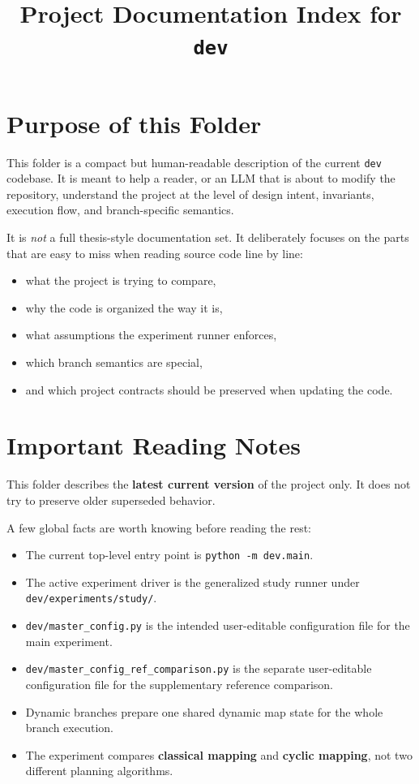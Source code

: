 \documentclass[11pt]{article}
\title{Project Documentation Index for \texttt{dev}}
\author{}
\date{}
\begin{document}
\maketitle

\section{Purpose of this Folder}

This folder is a compact but human-readable description of the current \texttt{dev} codebase. It is meant to help a reader, or an LLM that is about to modify the repository, understand the project at the level of design intent, invariants, execution flow, and branch-specific semantics.

It is \emph{not} a full thesis-style documentation set. It deliberately focuses on the parts that are easy to miss when reading source code line by line:
\begin{itemize}[leftmargin=2em]
    \item what the project is trying to compare,
    \item why the code is organized the way it is,
    \item what assumptions the experiment runner enforces,
    \item which branch semantics are special,
    \item and which project contracts should be preserved when updating the code.
\end{itemize}

\section{Important Reading Notes}

This folder describes the \textbf{latest current version} of the project only. It does not try to preserve older superseded behavior.

A few global facts are worth knowing before reading the rest:
\begin{itemize}[leftmargin=2em]
    \item The current top-level entry point is \texttt{python -m dev.main}.
    \item The active experiment driver is the generalized study runner under \texttt{dev/experiments/study/}.
    \item \texttt{dev/master\_config.py} is the intended user-editable configuration file for the main experiment.
    \item \texttt{dev/master\_config\_ref\_comparison.py} is the separate user-editable configuration file for the supplementary reference comparison.
    \item Dynamic branches prepare one shared dynamic map state for the whole branch execution.
    \item The experiment compares \textbf{classical mapping} and \textbf{cyclic mapping}, not two different planning algorithms.
\end{itemize}
\end{document}
